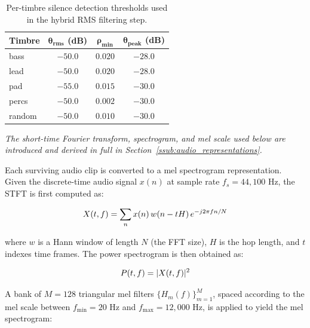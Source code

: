 \begin{table}[H]
\centering
\renewcommand{\arraystretch}{1.3}
\begin{tabular}{lccc}
\hline
\textbf{Timbre} & $\boldsymbol{\theta_{\text{rms}}}$ \textbf{(dB)} & $\boldsymbol{\rho_{\min}}$ & $\boldsymbol{\theta_{\text{peak}}}$ \textbf{(dB)} \\
\hline
bass   & $-50.0$ & $0.020$ & $-28.0$ \\
lead   & $-50.0$ & $0.020$ & $-28.0$ \\
pad    & $-55.0$ & $0.015$ & $-30.0$ \\
percs  & $-50.0$ & $0.002$ & $-30.0$ \\
random & $-50.0$ & $0.010$ & $-30.0$ \\
\hline
\end{tabular}
\vspace{0.3cm}
\caption{Per-timbre silence detection thresholds used in the hybrid RMS filtering step.}
\label{tab:silence_thresholds}
\end{table}

\noindent{}

\noindent\textit{The short-time Fourier transform, spectrogram, and mel scale used below are introduced and derived in full in Section~\ref{ssub:audio_representations}.}

Each surviving audio clip is converted to a mel spectrogram representation. Given the discrete-time audio signal $x(n)$ at sample rate $f_s = 44{,}100$ Hz, the STFT is first computed as:

\begin{equation}
X(t, f) = \sum_{n} x(n)\, w(n - tH)\, e^{-j2\pi fn/N}
\label{eq:stft}\eqname{Short-Time Fourier Transform for mel extraction}
\end{equation}

\noindent where $w$ is a Hann window of length $N$ (the FFT size), $H$ is the hop length, and $t$ indexes time frames. The power spectrogram is then obtained as:

\begin{equation}
P(t, f) = |X(t, f)|^2
\label{eq:power_spec}\eqname{Power spectrogram}
\end{equation}

\noindent A bank of $M = 128$ triangular mel filters $\{H_m(f)\}_{m=1}^{M}$, spaced according to the mel scale between $f_{\min} = 20$ Hz and $f_{\max} = 12{,}000$ Hz, is applied to yield the mel spectrogram:

